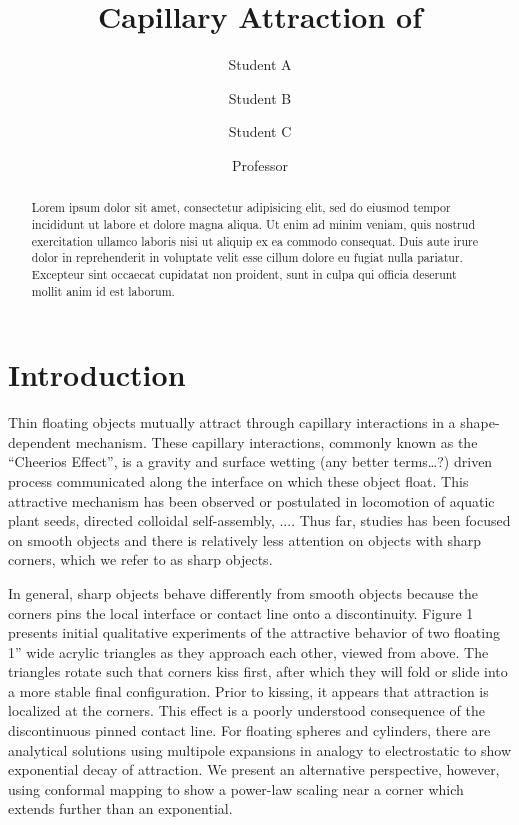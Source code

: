 \documentclass[twocolumn,prl]{revtex4-1}
\begin{document}
\title{Capillary Attraction of }
\author{Student A}
\author{Student B}
\author{Student C}
\author{Professor}

\begin{abstract}
	Lorem ipsum dolor sit amet, consectetur adipisicing elit, sed do eiusmod tempor incididunt ut labore et dolore magna aliqua. Ut enim ad minim veniam, quis nostrud exercitation ullamco laboris nisi ut aliquip ex ea commodo consequat. Duis aute irure dolor in reprehenderit in voluptate velit esse cillum dolore eu fugiat nulla pariatur. Excepteur sint occaecat cupidatat non proident, sunt in culpa qui officia deserunt mollit anim id est laborum.
\end{abstract}

\maketitle

\section{Introduction}
	
	Thin floating objects mutually attract through capillary interactions in a shape-dependent mechanism. These capillary interactions, commonly known as the “Cheerios Effect”, is a gravity and surface wetting (any better terms…?) driven process communicated along the interface on which these object float.  This attractive mechanism has been observed or postulated in locomotion of aquatic plant seeds, directed colloidal self-assembly, .... Thus far, studies has been focused on smooth objects and there is relatively less attention on objects with sharp corners, which we refer to as sharp objects. 
	
	In general, sharp objects behave differently from smooth objects because the corners pins the local interface or contact line onto a discontinuity. Figure 1 presents initial qualitative experiments of the attractive behavior of two floating 1'' wide acrylic triangles as they approach each other, viewed from above. The triangles rotate such that corners kiss first, after which they will fold or slide into a more stable final configuration. Prior to kissing, it appears that attraction is localized at the corners. This effect is a poorly understood consequence of the discontinuous pinned contact line. For floating spheres and cylinders, there are analytical solutions using multipole expansions in analogy to electrostatic to show exponential decay of attraction. We present an alternative perspective, however, using conformal mapping to show a power-law scaling near a corner which extends further than an exponential.
\end{document}
